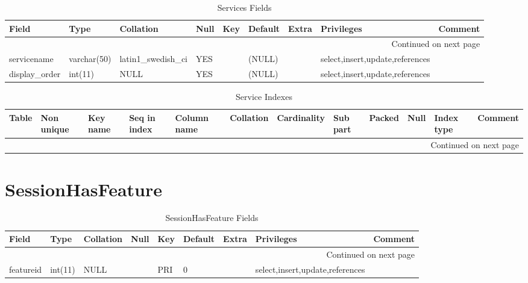 \documentclass[tablesignature,landscape]{scrartcl}
\begin{document}
\begin{longtable}{|l|l|l|l|l|l|l|l|l|}
\caption{Services Fields} \label{tbl:servicesfields}\\
\hline
 Field             &  Type         &  Collation                &  Null  &  Key  &  Default  &  Extra              &  Privileges                       &  Comment \\
\hline
\endhead
\hline\multicolumn{9}{r}{Continued on next page}\
\endfoot
\endlastfoot
\hline
 serviceid         &  int(11)      &  NULL                     &        &  PRI  &  (NULL)   &  auto\_{}increment  &  select,insert,update,references  &           \\
 servicename       &  varchar(50)  &  latin1\_{}swedish\_{}ci  &  YES   &       &  (NULL)   &                     &  select,insert,update,references  &           \\
 display\_{}order  &  int(11)      &  NULL                     &  YES   &       &  (NULL)   &                     &  select,insert,update,references  &           \\
\hline
\end{longtable}


\begin{longtable}{|l|l|l|l|l|l|l|l|l|l|l|l|}
\caption{Service Indexes} \label{tbl:serviceindexes}\\
\hline
 Table     &  Non unique  &  Key name  &  Seq in index  &  Column name  &  Collation  &  Cardinality  &  Sub part  &  Packed  &  Null  &  Index type  &  Comment \\
\hline
\endhead
\hline\multicolumn{12}{r}{Continued on next page}\
\endfoot
\endlastfoot
\hline
 Services  &           0  &  PRIMARY   &             1  &  serviceid    &  A          &           14  &  (NULL)    &  (NULL)  &        &  BTREE       &           \\
\hline
\end{longtable}
\section{SessionHasFeature}
\label{sec-26}


\begin{longtable}{|l|l|l|l|l|l|l|l|l|}
\caption{SessionHasFeature Fields} \label{tbl:sessionhasfeaturefields}\\
\hline
 Field      &  Type     &  Collation  &  Null  &  Key  &  Default  &  Extra  &  Privileges                       &  Comment \\
\hline
\endhead
\hline\multicolumn{9}{r}{Continued on next page}\
\endfoot
\endlastfoot
\hline
 sessionid  &  int(11)  &  NULL       &        &  PRI  &        0  &         &  select,insert,update,references  &           \\
 featureid  &  int(11)  &  NULL       &        &  PRI  &        0  &         &  select,insert,update,references  &           \\
\hline
\end{longtable}
\end{document}
